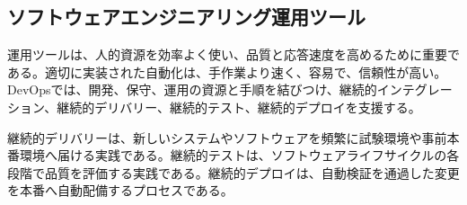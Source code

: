 \subsection{ソフトウェアエンジニアリング運用ツール}

運用ツールは、人的資源を効率よく使い、品質と応答速度を高めるために重要である。適切に実装された自動化は、手作業より速く、容易で、信頼性が高い。DevOpsでは、開発、保守、運用の資源と手順を結びつけ、継続的インテグレーション、継続的デリバリー、継続的テスト、継続的デプロイを支援する。

継続的デリバリーは、新しいシステムやソフトウェアを頻繁に試験環境や事前本番環境へ届ける実践である。継続的テストは、ソフトウェアライフサイクルの各段階で品質を評価する実践である。継続的デプロイは、自動検証を通過した変更を本番へ自動配備するプロセスである。

